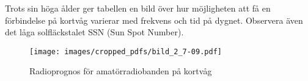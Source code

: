 Trots sin höga ålder ger tabellen en bild över hur möjligheten att få en
förbindelse på kortvåg varierar med frekvens och tid på dygnet.
Observera även det låga solfläckstalet SSN (Sun Spot Number).

\begin{figure*}
  \begin{center}
    \texttt{[image: images/cropped\_pdfs/bild\_2\_7-09.pdf]}
    \caption{Radioprognos för amatörradiobanden på kortvåg}
    \label{fig:bildII7-9}
  \end{center}
\end{figure*}

